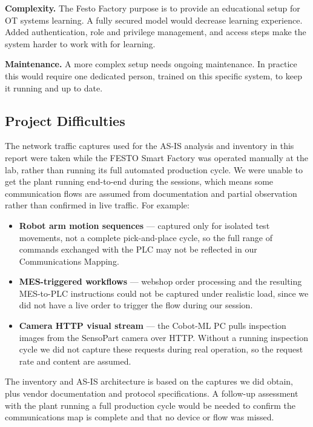 \documentclass[11pt,a4paper]{article}
\begin{document}
\textbf{Complexity.} The Festo Factory purpose is to provide an educational
setup for OT systems learning. A fully secured model would decrease learning
experience.
Added authentication, role and privilege management, and access
steps make the system harder to work with for learning.

\textbf{Maintenance.} A more complex setup needs ongoing maintenance. In
practice this would require one dedicated person, trained on this specific
system, to keep it running and up to date.

\subsection{Project Difficulties}
The network traffic captures used for the AS-IS analysis and inventory in this
report were taken while the FESTO Smart Factory was operated manually at the
lab, rather than running its full automated production cycle. We were unable to
get the plant running end-to-end during the sessions, which means some
communication flows are assumed from documentation and partial observation
rather than confirmed in live traffic.
For example:
\begin{itemize}
    \item \textbf{Robot arm motion sequences} — captured only for isolated test
        movements, not a complete pick-and-place cycle, so the full range of
        commands exchanged with the PLC may not be reflected in our
        Communications Mapping.
    \item \textbf{MES-triggered workflows} — webshop order processing and the
        resulting MES-to-PLC instructions could not be captured under realistic
        load, since we did not have a live order to trigger the flow during our
        session.
    \item \textbf{Camera HTTP visual stream} — the Cobot-ML PC pulls inspection
        images from the SensoPart camera over HTTP. Without a running inspection
        cycle we did not capture these requests during real operation, so the
        request rate and content are assumed.
\end{itemize}

The inventory and AS-IS architecture is based on the captures we did obtain,
plus vendor documentation and protocol specifications. A follow-up assessment
with the plant running a full production cycle would be needed to confirm the
communications map is complete and that no device or flow was missed.


\pagebreak
\end{document}
